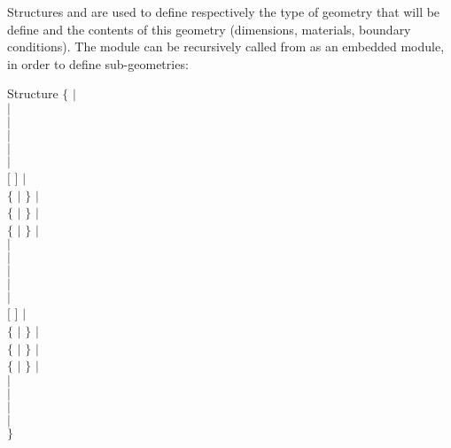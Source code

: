 Structures  and  are used to define respectively
the type of geometry that will be define and the contents of this geometry
(dimensions, materials, boundary conditions). The module  can be
recursively called from 
 as an embedded module, in order to define sub-geometries:

\begin{DataStructure}{Structure }
$\{$  $|$ \\
 $|$\\
  $|$ \\
  $|$ \\
   $|$\\ 
    $|$  \\
  $[$   $]$  $|$\\
  $\{$  $|$    $\}$ $|$\\ 
  $\{$  $|$    $\}$ $|$\\
  $\{$  $|$    $\}$ $|$ \\
   $|$ \\
  $|$ \\
   $|$ \\
  $|$ \\
   $|$ \\
  $[$   $]$ $|$\\
  $\{$  $|$    $\}$ $|$ \\
  $\{$  $|$    $\}$ $|$ \\ 
  $\{$  $|$    $\}$ $|$ \\
  $|$ \\
   $|$ \\
  $|$ \\
    $|$ \\
  $\}$
\end{DataStructure}


